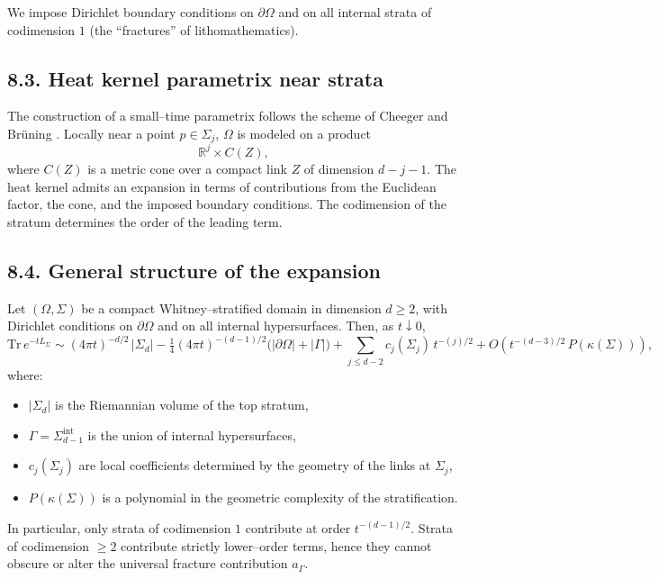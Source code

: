 We impose Dirichlet boundary conditions on $\partial\Omega$ and on all internal strata of codimension $1$ (the “fractures” of lithomathematics).

\subsection*{8.3. Heat kernel parametrix near strata}
The construction of a small–time parametrix follows the scheme of Cheeger \cite{Cheeger80} and Brüning \cite{BruningSeeley88}. Locally near a point $p\in \Sigma_j$, $\Omega$ is modeled on a product
\[
\mathbb{R}^j \times C(Z),
\]
where $C(Z)$ is a metric cone over a compact link $Z$ of dimension $d-j-1$. The heat kernel admits an expansion in terms of contributions from the Euclidean factor, the cone, and the imposed boundary conditions. The codimension of the stratum determines the order of the leading term.

\subsection*{8.4. General structure of the expansion}
\begin{theorem}\label{thm:stratified}
Let $(\Omega,\Sigma)$ be a compact Whitney–stratified domain in dimension $d\ge 2$, with Dirichlet conditions on $\partial\Omega$ and on all internal hypersurfaces. Then, as $t\downarrow 0$,
\[
\mathrm{Tr}\, e^{-tL_\Sigma}
\sim (4\pi t)^{-d/2} \,|\Sigma_d|
-\tfrac14(4\pi t)^{-(d-1)/2}\big(|\partial\Omega|+|\Gamma|\big)
+\sum_{j\le d-2} c_j(\Sigma_j)\, t^{-(j)/2}
+O\!\left(t^{-(d-3)/2}\,P(\kappa(\Sigma))\right),
\]
where:
\begin{itemize}
\item $|\Sigma_d|$ is the Riemannian volume of the top stratum,
\item $\Gamma=\Sigma_{d-1}^{\mathrm{int}}$ is the union of internal hypersurfaces,
\item $c_j(\Sigma_j)$ are local coefficients determined by the geometry of the links at $\Sigma_j$,
\item $P(\kappa(\Sigma))$ is a polynomial in the geometric complexity of the stratification.
\end{itemize}
\end{theorem}

\begin{remark}
In particular, only strata of codimension $1$ contribute at order $t^{-(d-1)/2}$. Strata of codimension $\ge 2$ contribute strictly lower–order terms, hence they cannot obscure or alter the universal fracture contribution $a_\Gamma$.
\end{remark}

